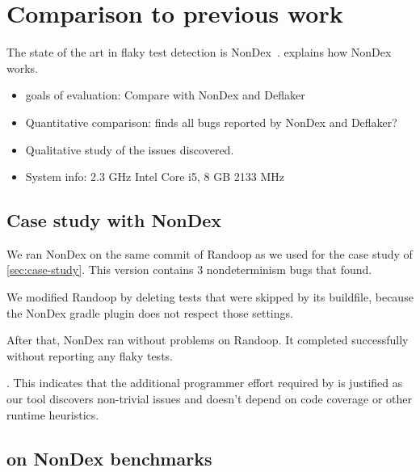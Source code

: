 \section{Comparison to previous work}

The state of the art in flaky test detection is NonDex~\cite{nondex}.
 explains how NonDex works.



\begin{itemize}
    \item goals of evaluation: Compare with NonDex and Deflaker
    \item Quantitative comparison: \TheDeterminismChecker finds all bugs reported by NonDex and Deflaker?
    \item Qualitative study of the issues discovered.
    \item System info: 2.3 GHz Intel Core i5, 8 GB 2133 MHz
\end{itemize}


\subsection{Case study with NonDex}\label{sec:nondex-randoop}

We ran NonDex on the same commit of Randoop as we used for the case study
of \cref{sec:case-study}.  This version contains 3 nondeterminism bugs that
\ourTool found.

We modified Randoop by deleting tests that were skipped by its buildfile,
because the NonDex gradle plugin does not respect those settings.

After that, NonDex ran without problems on Randoop.
It completed successfully without reporting any flaky tests.


.
This indicates that the additional programmer effort required by \TheDeterminismChecker is justified
as our tool discovers non-trivial issues and doesn't depend on code coverage or other runtime heuristics.

\subsection{\OurTool on NonDex benchmarks}\label{sec:nondex-benchmarks}

